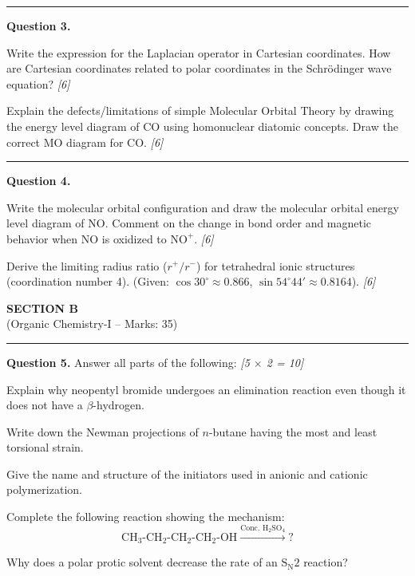 \documentclass[11pt,a4paper]{article}
\newcommand{\pts}[1]{\hfill   \textit{[#1]}}
\begin{document}
\medskip\rule{\linewidth}{0.2pt}




\noindent   \textbf{Question 3.}

\begin{parts}
  \item Write the expression for the Laplacian operator in Cartesian coordinates. How are Cartesian coordinates related to polar coordinates in the Schr\"odinger wave equation? \pts{6}
  \item Explain the defects/limitations of simple Molecular Orbital Theory by drawing the energy level diagram of $ \text{CO}$ using homonuclear diatomic concepts. Draw the correct MO diagram for $ \text{CO}$. \pts{6}
\end{parts}

\medskip\rule{\linewidth}{0.2pt}




\noindent   \textbf{Question 4.}

\begin{parts}
  \item Write the molecular orbital configuration and draw the molecular orbital energy level diagram of $ \text{NO}$. Comment on the change in bond order and magnetic behavior when $ \text{NO}$ is oxidized to $ \text{NO}^+$. \pts{6}
  \item Derive the limiting radius ratio ($r^+/r^-$) for tetrahedral ionic structures (coordination number 4). (Given: $\cos 30^\circ \approx 0.866$, $\sin 54^\circ44' \approx 0.8164$). \pts{6}
\end{parts}


\newpage

\begin{center}
  {\large\bfseries SECTION B}\\[2pt]
  {\normalsize (Organic Chemistry-I -- Marks: 35)}
\end{center}
\rule{0.4\linewidth}{0.2pt}
\smallskip




\noindent   \textbf{Question 5.} Answer all parts of the following: \pts{5 $ \times$ 2 = 10}

\begin{parts}
  \item Explain why neopentyl bromide undergoes an elimination reaction even though it does not have a $\beta$-hydrogen.
  \item Write down the Newman projections of $n$-butane having the most and least torsional strain.
  \item Give the name and structure of the initiators used in anionic and cationic polymerization.
  \item Complete the following reaction showing the mechanism:
    \[  \text{CH}_3 \text{-CH}_2 \text{-CH}_2 \text{-CH}_2 \text{-OH} \xrightarrow{ \text{Conc. H}_2 \text{SO}_4} ? \]
  \item Why does a polar protic solvent decrease the rate of an $ \text{S}_{ \text{N}}2$ reaction?
\end{parts}
\end{document}
